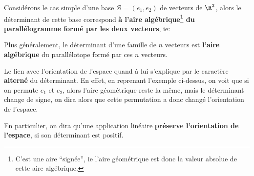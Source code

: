 Considérons le cas simple d'une base \(\mathscr{B} = (e_1, e_2)\) de vecteurs de \(\R^2\), alors le déterminant de cette base correspond \textbf{à l'aire algébrique\footnote[2]{C'est une aire ``signée'', ie l'aire géométrique est donc la valeur absolue de cette aire algébrique.} du parallélogramme formé par les deux vecteurs}, ie:
\begin{center}
\end{center}
Plus généralement, le déterminant d'une famille de \(n\) vecteurs est \textbf{l'aire algébrique} du parallélotope formé par ces \(n\) vecteurs.\<

Le lien avec l'orientation de l'espace quand à lui s'explique par le caractère \textbf{alterné} du déterminant.\+
En effet, en reprenant l'exemple ci-dessus, on voit que si on permute \(e_1\) et \(e_2\), alors l'aire géométrique reste la même, mais le déterminant change de signe, on dira alors que cette permutation a donc changé l'orientation de l'espace.\<

En particulier, on dira qu'une application linéaire \textbf{préserve l'orientation de l'espace}, si son déterminant est positif.